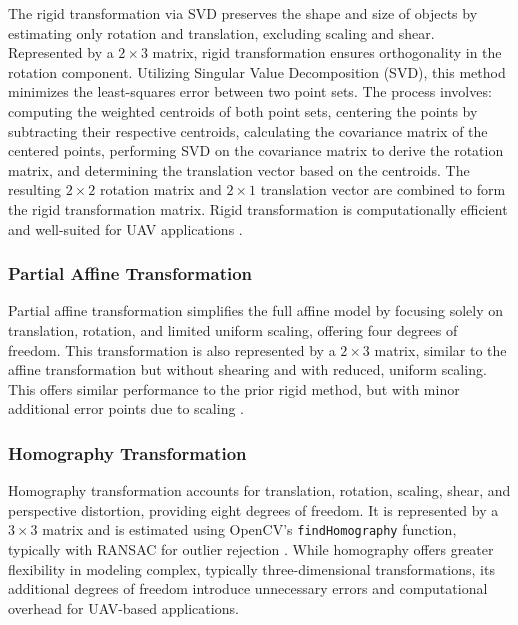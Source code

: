 The rigid transformation via SVD preserves the shape and size of objects by estimating only rotation and translation, excluding scaling and shear. Represented by a  \(2 \times 3\) matrix, rigid transformation ensures orthogonality in the rotation component. Utilizing Singular Value Decomposition (SVD), this method minimizes the least-squares error between two point sets. The process involves: computing the weighted centroids of both point sets, centering the points by subtracting their respective centroids, calculating the covariance matrix of the centered points, performing SVD on the covariance matrix to derive the rotation matrix, and determining the translation vector based on the centroids. The resulting \(2 \times 2\) rotation matrix and \(2 \times 1\) translation vector are combined to form the rigid transformation matrix. Rigid transformation is computationally efficient and well-suited for UAV applications \cite{sorkine2017least_squares}.


\subsubsection{Partial Affine Transformation}

Partial affine transformation simplifies the full affine model by focusing solely on translation, rotation, and limited uniform scaling, offering four degrees of freedom. This transformation is also represented by a \(2 \times 3\) matrix, similar to the affine transformation but without shearing and with reduced, uniform scaling. This offers similar performance to the prior rigid method, but with minor additional error points due to scaling \cite{opencv_warp_affine}.

\subsubsection{Homography Transformation}

Homography transformation accounts for translation, rotation, scaling, shear, and perspective distortion, providing eight degrees of freedom. It is represented by a \(3 \times 3\) matrix and is estimated using OpenCV's \texttt{findHomography} function, typically with RANSAC for outlier rejection \cite{opencv_homography}. While homography offers greater flexibility in modeling complex, typically three-dimensional transformations, its additional degrees of freedom introduce unnecessary errors and computational overhead for UAV-based applications.



